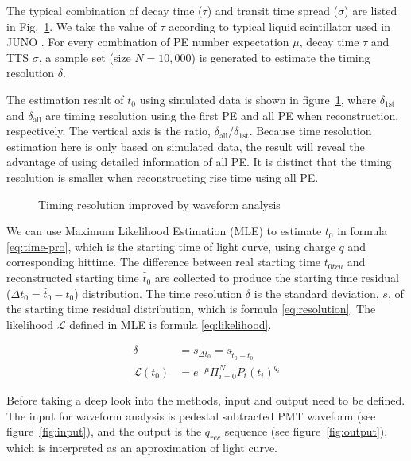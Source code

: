 The typical combination of decay time ($\tau$) and transit time spread ($\sigma$) are listed in Fig.~\ref{fig:reso-diff}. We take the value of $\tau$ according to typical liquid scintillator used in JUNO \cite{ludhova_particle_2020}. For every combination of PE number expectation $\mu$, decay time $\tau$ and TTS $\sigma$, a sample set (size $N=10,000$) is generated to estimate the timing resolution $\delta$. 

The estimation result of $t_{0}$ using simulated data is shown in figure~\ref{fig:reso-diff}, where $\delta_{\mathrm{1st}}$ and $\delta_{\mathrm{all}}$ are timing resolution using the first PE and all PE when reconstruction, respectively. The vertical axis is the ratio, $\delta_{\mathrm{all}}/\delta_{\mathrm{1st}}$. Because time resolution estimation here is only based on simulated data, the result will reveal the advantage of using detailed information of all PE. It is distinct that the timing resolution is smaller when reconstructing rise time using all PE. 

\begin{figure}[H]
    \centering
    \scalebox{0.5}{}
    \caption{\label{fig:reso-diff} Timing resolution improved by waveform analysis}
\end{figure}

We can use Maximum Likelihood Estimation (MLE) to estimate $t_{0}$ in formula \eqref{eq:time-pro}, which is the starting time of light curve, using charge $q$ and corresponding hittime. The difference between real starting time $t_{0tru}$ and reconstructed starting time $\hat{t}_0$ are collected to produce the starting time residual ($\Delta t_{0}=\hat{t}_0-t_0$) distribution. The time resolution $\delta$ is the standard deviation, $s$, of the starting time residual distribution, which is formula \eqref{eq:resolution}. The likelihood $\mathcal{L}$ defined in MLE is formula \eqref{eq:likelihood}. 

\begin{align}
  \delta &= s_{\Delta t_{0}} = s_{\hat{t}_0-t_0} \label{eq:resolution} \\
  \mathcal{L}(t_{0}) &= e^{-\mu}\Pi_{i=0}^{N}P_{t}(t_{i})^{q_{i}} \label{eq:likelihood}
\end{align}


Before taking a deep look into the methods, input and output need to be defined. The input for waveform analysis is pedestal subtracted PMT waveform (see figure~\ref{fig:input}), and the output is the $q_{rec}$ sequence (see figure~\ref{fig:output}), which is interpreted as an approximation of light curve. 

